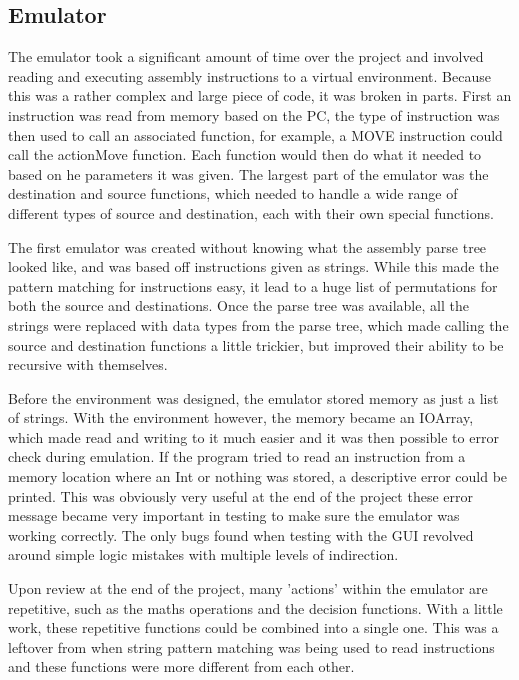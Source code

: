 \documentclass[10point]{article}
\begin{document}
\subsection{Emulator}
The emulator took a significant amount of time over the project and involved reading and executing assembly instructions to a virtual environment. Because this was a rather complex and large piece of code, it was broken in parts. First an instruction was read from memory based on the PC, the type of instruction was then used to call an associated function, for example, a MOVE instruction could call the actionMove function. Each function would then do what it needed to based on he parameters it was given. The largest part of the emulator was the destination and source functions, which needed to handle a wide range of different types of source and destination, each with their own special functions.

The first emulator was created without knowing what the assembly parse tree looked like, and was based off instructions given as strings. While this made the pattern matching for instructions easy, it lead to a huge list of permutations for both the source and destinations. Once the parse tree was available, all the strings were replaced with data types from the parse tree, which made calling the source and destination functions a little trickier, but improved their ability to be recursive with themselves.

Before the environment was designed, the emulator stored memory as just a list of strings. With the environment however, the memory became an IOArray, which made read and writing to it much easier and it was then possible to error check during emulation. If the program tried to read an instruction from a memory location where an Int or nothing was stored, a descriptive error could be printed. This was obviously very useful at the end of the project these error message became very important in testing to make sure the emulator was working correctly. The only bugs found when testing with the GUI revolved around simple logic mistakes with multiple levels of indirection. 

Upon review at the end of the project, many 'actions' within the emulator are repetitive, such as the maths operations and the decision functions. With a little work, these repetitive functions could be combined into a single one. This was a leftover from when string pattern matching was being used to read instructions and these functions were more different from each other.
\end{document}
